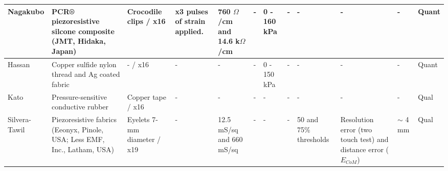 \begin{landscape}
\begin{table}[H]
\begin{tabular}{|L{1.9cm}|L{2.8cm}|L{2.0cm}|L{2.4cm}|L{2.2cm}|L{2.0cm}|L{1.7cm}|L{1.7cm}|L{2.5cm}|L{2.2cm}|L{1.6cm}|L{1.6cm}|}
			Nagakubo \citep{Nagakubo2007} & PCR® piezoresistive silcone composite (JMT, Hidaka, Japan) & Crocodile clips / x16 & x3 pulses of strain applied. & 760 $\Omega$/cm and 14.6 k$\Omega$/cm & - & 0 - 160 kPa & - & - & - & - & Quant \\ \hline
			
			Hassan \citep{Hassan2009} & Copper sulfide nylon thread and Ag coated fabric & - / x16 & - & - & - & 0 - 150 kPa & - & - & - & - & Quant \\ \hline
			
			Kato \citep{Kato2007} & Pressure-sensitive conductive rubber & Copper tape / x16 & - & - & - & - & - & - & - & - & Qual \\ \hline
			
			Silvera-Tawil \citep{Tawil2011} & Piezoresistive fabrics (Eeonyx, Pinole, USA; Less EMF, Inc., Latham, USA) & Eyelets 7-mm diameter / x19 & - & 12.5 mS/sq and 660 mS/sq & - & - & - & 50 and 75\% thresholds & Resolution error (two touch test) and distance error ($E_{CoM}$) & $\sim$ 4 mm & Qual \\ \hline
			
		\end{tabular}
	\end{table}
\end{landscape}

